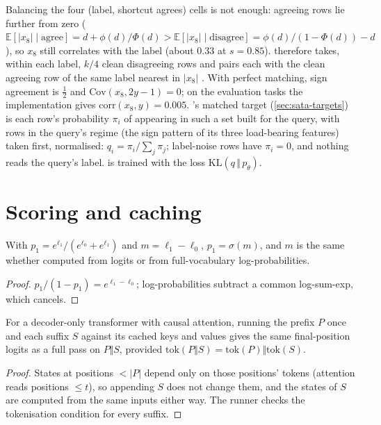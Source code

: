 Balancing the four (label, shortcut agrees) cells is not enough: agreeing rows lie further from zero ($\mathbb{E}[|x_8| \mid \text{agree}] = d + \phi(d)/\Phi(d) > \mathbb{E}[|x_8| \mid \text{disagree}] = \phi(d)/(1-\Phi(d)) - d$), so $x_8$ still correlates with the label (about 0.33 at $s = 0.85$).
 therefore takes, within each label, $k/4$ clean disagreeing rows and pairs each with the clean agreeing row of the same label nearest in $|x_8|$ \citep{rubin1973matching,stuart2010matching}.
With perfect matching, sign agreement is $\tfrac12$ and $\mathrm{Cov}(x_8, 2y-1) = 0$; on the evaluation tasks the implementation gives $\mathrm{corr}(x_8, y) = 0.005$.
\sata's matched target (\autoref{sec:sata-targets}) is each row's probability $\pi_i$ of appearing in such a set built for the query, with rows in the query's regime (the sign pattern of its three load-bearing features) taken first, normalised: $q_i = \pi_i / \sum_j \pi_j$; label-noise rows have $\pi_i = 0$, and nothing reads the query's label.
\sata is trained with the loss $\mathrm{KL}(q \,\Vert\, p_\theta)$.

\section{Scoring and caching}

\begin{lemma}[Margin]
With $p_1 = e^{\ell_1}/(e^{\ell_0} + e^{\ell_1})$ and $m = \ell_1 - \ell_0$, $p_1 = \sigma(m)$, and $m$ is the same whether computed from logits or from full-vocabulary log-probabilities.
\end{lemma}
\begin{proof}
$p_1/(1 - p_1) = e^{\ell_1 - \ell_0}$; log-probabilities subtract a common log-sum-exp, which cancels.
\end{proof}

\begin{proposition}
For a decoder-only transformer with causal attention, running the prefix $P$ once and each suffix $S$ against its cached keys and values gives the same final-position logits as a full pass on $P \Vert S$, provided $\mathrm{tok}(P \Vert S) = \mathrm{tok}(P) \Vert \mathrm{tok}(S)$.
\end{proposition}
\begin{proof}
States at positions $< |P|$ depend only on those positions' tokens (attention reads positions $\le t$), so appending $S$ does not change them, and the states of $S$ are computed from the same inputs either way. The runner checks the tokenisation condition for every suffix.
\end{proof}

